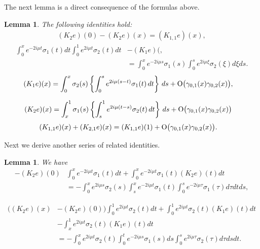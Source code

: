 \documentclass[11pt]{amsart}
\theoremstyle{plain}
\newtheorem{lem}[thm]{Lemma}
\theoremstyle{definition}
\theoremstyle{remark}
\numberwithin{equation}{section}
\begin{document}
The next lemma is a direct consequence of the formulas above.
\begin{lem}\label{Ksq}
The following identities hold:
\begin{align}
(K_2e)(0)-(K_2e)(x)=(K_{1,1}e)(x),\label{ls2}
\end{align}
\begin{align}
\int_0^xe^{-2i \mu t}\sigma_1(t) dt\int_0^1e^{2i \mu t}\sigma_2(t) dt&-(K_{1}e)(,\nonumber\\
& =\int_0^xe^{-2i\mu s}\sigma_1(s)\int_0^s e^{2i\mu \xi}\sigma_2(\xi) d \xi ds.\label{lc1}
\end{align}
\begin{align}\label{K1short}
(K_{1}e)(x)&=
\int_0^x\sigma_2(s)
\left\{\int_0^s e^{2i\mu(s-t)}
\sigma_1(t)\,dt\right\}\,ds+{\rm O}\big(\gamma_{0,1}(x)\gamma_{0,2}(x)\big),
\end{align}

\begin{align}\label{K2short}
(K_{2}e)(x)&=\int_x^1\sigma_1(s)
\left\{\int_s^1 e^{2i\mu(t-s)}
\sigma_2(t)\,dt\right\}\,ds
+{\rm O}\big(\gamma_{0,1}(x)\gamma_{0,2}(x)\big)
\end{align}
\begin{align*}
(K_{1,1}e)(x)+(K_{2,1}e)(x)&=(K_{1,1}e)(1)+{\rm O}\big(\gamma_{0,1}(x)\gamma_{0,2}(x)\big).
\end{align*}
\end{lem}

Next we derive another series of related identities.
\begin{lem}
We have
\begin{align}
-(K_2e)(0)&\int_0^xe^{-2i \mu t}\sigma_1(t) dt
+\int_0^xe^{-2i \mu t}\sigma_1(t)(K_2e)(t) dt\nonumber\\
&=-\int_0^xe^{2i \mu s}\sigma_2(s) \int_s^xe^{-2i \mu t}\sigma_1(t)\int_0^se^{-2i \mu \tau}\sigma_1(\tau) d\tau dt ds,\label{ls1}
\end{align}

\begin{align}
\Big((K_2e)(x)&-(K_2e)(0)\Big)\int_0^1e^{2i \mu t}\sigma_2(t) dt
+\int_0^1e^{2i \mu t}\sigma_2(t)(K_1e)(t) dt \nonumber\\
&-\int_x^1e^{2i \mu t}\sigma_2(t)(K_1e)(t) dt \nonumber\\
&=-\int_0^xe^{2i \mu t}\sigma_2(t) \int_0^te^{-2i \mu s}\sigma_1(s)ds\int_0^se^{2i \mu \tau}\sigma_2(\tau) d\tau ds dt.\label{lc2}
\end{align}
\end{lem}
\end{document}
